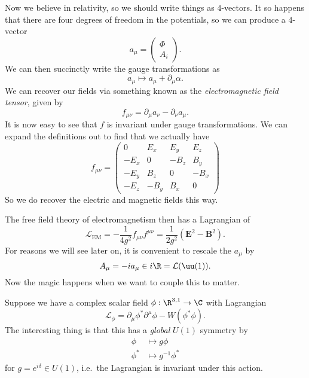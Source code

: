 \documentclass[a4paper]{article}
\begin{document}
Now we believe in relativity, so we should write things as $4$-vectors. It so happens that there are four degrees of freedom in the potentials, so we can produce a $4$-vector
\[
  a_\mu =
  \begin{pmatrix}
    \Phi\\
    A_i
  \end{pmatrix}.
\]
We can then succinctly write the gauge transformations as
\[
  a_\mu \mapsto a_\mu + \partial_\mu \alpha.
\]
We can recover our fields via something known as the \emph{electromagnetic field tensor}, given by
\[
  f_{\mu\nu} = \partial_\mu a_\nu - \partial_\nu a_\mu.
\]
It is now easy to see that $f$ is invariant under gauge transformations. We can expand the definitions out to find that we actually have
\[
  f_{\mu\nu} =
  \begin{pmatrix}
    0 & E_x & E_y & E_z\\
    -E_x & 0 & -B_z & B_y\\
    -E_y & B_z & 0 & -B_x\\
    -E_z & -B_y & B_x & 0
  \end{pmatrix}
\]
So we do recover the electric and magnetic fields this way.

The free field theory of electromagnetism then has a Lagrangian of
\[
  \mathcal{L}_{\mathrm{EM}} = - \frac{1}{4 g^2} f_{\mu\nu} f^{\mu\nu} = \frac{1}{2g^2}(\mathbf{E}^2 - \mathbf{B}^2).
\]
For reasons we will see later on, it is convenient to rescale the $a_\mu$ by
\[
  A_\mu = -i a_\mu \in i\R = \mathcal{L}(\uu(1)).
\]
Now the magic happens when we want to couple this to matter.

Suppose we have a complex scalar field $\phi: \R^{3, 1} \to \C$ with Lagrangian
\[
  \mathcal{L}_\phi = \partial_\mu \phi^* \partial^\mu \phi - W(\phi^* \phi).
\]
The interesting thing is that this has a \emph{global} $U(1)$ symmetry by
\begin{align*}
  \phi &\mapsto g \phi\\
  \phi^* &\mapsto g^{-1}\phi^*
\end{align*}
for $g = e^{i\delta} \in U(1)$, i.e.\ the Lagrangian is invariant under this action.
\end{document}
